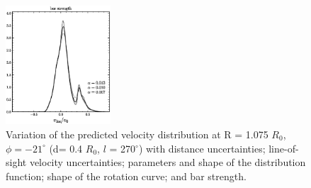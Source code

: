 \documentclass[12pt,preprint]{aastex}
\newcommand{\Ro}{\ensuremath{R_0}}
\begin{document}
\begin{figure}
\includegraphics[width=0.35\textwidth]{barstrength.ps}
\caption{Variation of the predicted velocity distribution at R = 1.075
  \Ro , $\phi = -21^{\circ}$ (d= 0.4 \Ro, $l$ = 270$^{\circ}$) with
  distance uncertainties; line-of-sight velocity uncertainties;
  parameters and shape of the distribution function; shape of the
  rotation curve; and bar strength.}\label{fig:1dvar}
\end{figure}
\end{document}
